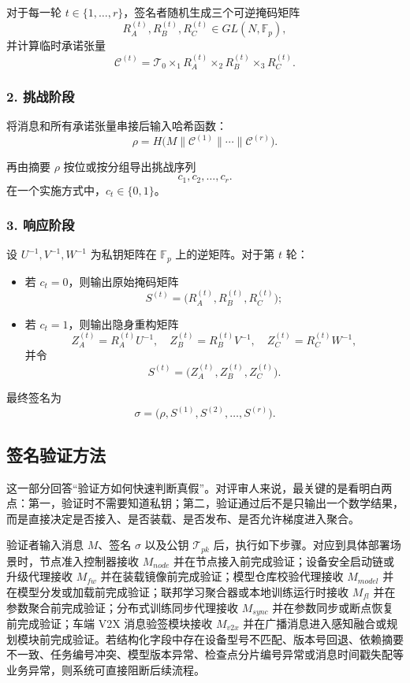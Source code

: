 \documentclass[12pt,a4paper]{article}
\begin{document}
对于每一轮 $t\in\{1,\dots,r\}$，签名者随机生成三个可逆掩码矩阵
\[
R_A^{(t)},R_B^{(t)},R_C^{(t)} \in GL(N,\mathbb{F}_p),
\]
并计算临时承诺张量
\[
\mathcal{C}^{(t)}=\mathcal{T}_0 \times_1 R_A^{(t)} \times_2 R_B^{(t)} \times_3 R_C^{(t)}.
\]

\subsubsection{2. 挑战阶段}

将消息和所有承诺张量串接后输入哈希函数：
\[
\rho = H\big(M \parallel \mathcal{C}^{(1)} \parallel \cdots \parallel \mathcal{C}^{(r)}\big).
\]

再由摘要 $\rho$ 按位或按分组导出挑战序列
\[
c_1,c_2,\dots,c_r.
\]
在一个实施方式中，$c_t \in \{0,1\}$。

\subsubsection{3. 响应阶段}

设 $U^{-1},V^{-1},W^{-1}$ 为私钥矩阵在 $\mathbb{F}_p$ 上的逆矩阵。对于第 $t$ 轮：

\begin{itemize}
    \item 若 $c_t=0$，则输出原始掩码矩阵
    \[
    S^{(t)}=\big(R_A^{(t)},R_B^{(t)},R_C^{(t)}\big);
    \]
    \item 若 $c_t=1$，则输出隐身重构矩阵
    \[
    Z_A^{(t)}=R_A^{(t)}U^{-1},\quad
    Z_B^{(t)}=R_B^{(t)}V^{-1},\quad
    Z_C^{(t)}=R_C^{(t)}W^{-1},
    \]
    并令
    \[
    S^{(t)}=\big(Z_A^{(t)},Z_B^{(t)},Z_C^{(t)}\big).
    \]
\end{itemize}

最终签名为
\[
\sigma=\big(\rho,S^{(1)},S^{(2)},\dots,S^{(r)}\big).
\]

\subsection{签名验证方法}

这一部分回答“验证方如何快速判断真假”。对评审人来说，最关键的是看明白两点：第一，验证时不需要知道私钥；第二，验证通过后不是只输出一个数学结果，而是直接决定是否接入、是否装载、是否发布、是否允许梯度进入聚合。

验证者输入消息 $M$、签名 $\sigma$ 以及公钥 $\mathcal{T}_{pk}$ 后，执行如下步骤。对应到具体部署场景时，节点准入控制器接收 $M_{node}$ 并在节点接入前完成验证；设备安全启动链或升级代理接收 $M_{fw}$ 并在装载镜像前完成验证；模型仓库校验代理接收 $M_{model}$ 并在模型分发或加载前完成验证；联邦学习聚合器或本地训练运行时接收 $M_{fl}$ 并在参数聚合前完成验证；分布式训练同步代理接收 $M_{sync}$ 并在参数同步或断点恢复前完成验证；车端 V2X 消息验签模块接收 $M_{v2x}$ 并在广播消息进入感知融合或规划模块前完成验证。若结构化字段中存在设备型号不匹配、版本号回退、依赖摘要不一致、任务编号冲突、模型版本异常、检查点分片编号异常或消息时间戳失配等业务异常，则系统可直接阻断后续流程。
\end{document}
